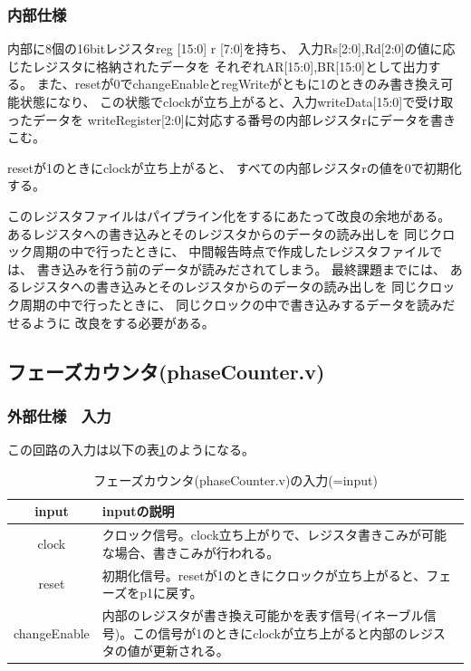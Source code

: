 \documentclass[a4j,titlepage]{jarticle}
\begin{document}
\subsubsection{内部仕様}
内部に8個の16bitレジスタreg [15:0] r [7:0]を持ち、
入力Rs[2:0],Rd[2:0]の値に応じたレジスタに格納されたデータを
それぞれAR[15:0],BR[15:0]として出力する。
また、resetが0でchangeEnableとregWriteがともに1のときのみ書き換え可能状態になり、
この状態でclockが立ち上がると、入力writeData[15:0]で受け取ったデータを
writeRegister[2:0]に対応する番号の内部レジスタrにデータを書きこむ。

resetが1のときにclockが立ち上がると、
すべての内部レジスタrの値を0で初期化する。

このレジスタファイルはパイプライン化をするにあたって改良の余地がある。
あるレジスタへの書き込みとそのレジスタからのデータの読み出しを
同じクロック周期の中で行ったときに、
中間報告時点で作成したレジスタファイルでは、
書き込みを行う前のデータが読みだされてしまう。
最終課題までには、
あるレジスタへの書き込みとそのレジスタからのデータの読み出しを
同じクロック周期の中で行ったときに、
同じクロックの中で書き込みするデータを読みだせるように
改良をする必要がある。





\newpage
\subsection{フェーズカウンタ(phaseCounter.v)}

\subsubsection{外部仕様　入力}
この回路の入力は以下の表\ref{phaseCounterI}のようになる。
\begin{table}[H]
    \caption{フェーズカウンタ(phaseCounter.v)の入力(=input)}
    \label{phaseCounterI}
    \begin{center}
    \begin {tabularx}{150mm}{|c|X|} \hline
         input & inputの説明 \\ \hline \hline
         clock & クロック信号。clock立ち上がりで、レジスタ書きこみが可能な場合、書きこみが行われる。 \\ \hline
         reset & 初期化信号。resetが1のときにクロックが立ち上がると、フェーズをp1に戻す。\\ \hline 
         changeEnable & 内部のレジスタが書き換え可能かを表す信号(イネーブル信号)。この信号が1のときにclockが立ち上がると内部のレジスタの値が更新される。\\ \hline
    \end{tabularx}
    \end{center}
\end{table}
\end{document}
